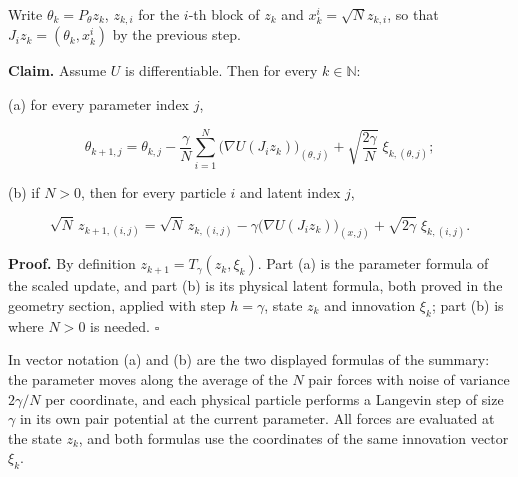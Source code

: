 \documentclass[11pt,a4paper]{report}
\begin{document}
Write \(\theta_k=P_\theta z_k\), \(z_{k,i}\) for the \(i\)-th block of \(z_k\) and \(x_k^i=\sqrt Nz_{k,i}\), so that \(J_iz_k=(\theta_k,x_k^i)\) by the previous step.




\textbf{Claim.} Assume \(U\) is differentiable. Then for every \(k\in\mathbb N\):




(a) for every parameter index \(j\),


\[\theta_{k+1,j}=\theta_{k,j}-\frac\gamma N\sum_{i=1}^N\bigl(\nabla U(J_iz_k)\bigr)_{(\theta,j)}+\sqrt{\frac{2\gamma}N}\;\xi_{k,(\theta,j)};\]


(b) if \(N>0\), then for every particle \(i\) and latent index \(j\),


\[\sqrt N\,z_{k+1,(i,j)}=\sqrt N\,z_{k,(i,j)}-\gamma\bigl(\nabla U(J_iz_k)\bigr)_{(x,j)}+\sqrt{2\gamma}\;\xi_{k,(i,j)} .\]


\textbf{Proof.} By definition \(z_{k+1}=T_\gamma(z_k,\xi_k)\). Part (a) is the parameter formula of the scaled update, and part (b) is its physical latent formula, both proved in the geometry section, applied with step \(h=\gamma\), state \(z_k\) and innovation \(\xi_k\); part (b) is where \(N>0\) is needed. \(\square\)




In vector notation (a) and (b) are the two displayed formulas of the summary: the parameter moves along the average of the \(N\) pair forces with noise of variance \(2\gamma/N\) per coordinate, and each physical particle performs a Langevin step of size \(\gamma\) in its own pair potential at the current parameter. All forces are evaluated at the state \(z_k\), and both formulas use the coordinates of the same innovation vector \(\xi_k\).
\end{document}
